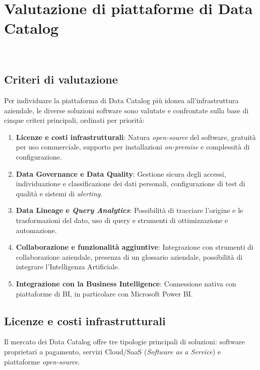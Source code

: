 \chapter{Valutazione di piattaforme di Data Catalog}
\label{cap:valutazione-competitor}

\\

\section{Criteri di valutazione}\label{sec:criteri}
Per individuare la piattaforma di Data Catalog più idonea all'infrastruttura aziendale, le diverse soluzioni software sono valutate e confrontate sulla base di cinque criteri principali, ordinati per priorità:
\begin{enumerate}
    \item \textbf{Licenze e costi infrastrutturali}: Natura \emph{open-source} del software, gratuità per uso commerciale, supporto per installazioni \emph{on-premise} e complessità di configurazione.
    \item \textbf{Data Governance e Data Quality}: Gestione sicura degli accessi, individuazione e classificazione dei dati personali, configurazione di test di qualità e sistemi di \emph{alerting}.
    \item \textbf{Data Lineage e \emph{Query Analytics}}: Possibilità di tracciare l'origine e le trasformazioni del dato, uso di query e strumenti di ottimizzazione e automazione.
    \item \textbf{Collaborazione e funzionalità aggiuntive}: Integrazione con strumenti di collaborazione aziendale, presenza di un glossario aziendale, possibilità di integrare l'Intelligenza Artificiale.
    \item \textbf{Integrazione con la Business Intelligence}: Connessione nativa con piattaforme di BI, in particolare con Microsoft Power BI.
\end{enumerate}

\section{Licenze e costi infrastrutturali}
Il mercato dei Data Catalog offre tre tipologie principali di soluzioni: software proprietari a pagamento, servizi Cloud/SaaS (\emph{Software as a Service}) e piattaforme \emph{open-source}.

